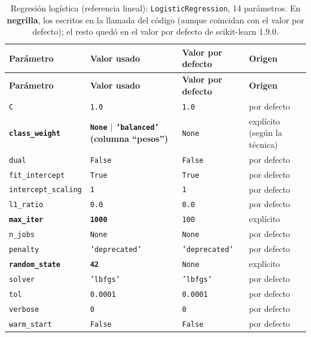\begin{longtable}{L{3.9cm} L{3.7cm} L{3.0cm} L{2.4cm}}
\caption{Regresión logística (referencia lineal): \texttt{LogisticRegression}, 14 parámetros. En \textbf{negrilla}, los escritos en la llamada del código (aunque coincidan con el valor por defecto); el resto quedó en el valor por defecto de scikit-learn 1.9.0.}\label{tab:param-reglog}\\
\toprule
\textbf{Parámetro} & \textbf{Valor usado} & \textbf{Valor por defecto} & \textbf{Origen} \\
\midrule
\endfirsthead
\toprule
\textbf{Parámetro} & \textbf{Valor usado} & \textbf{Valor por defecto} & \textbf{Origen} \\
\midrule
\endhead
\bottomrule
\endfoot
\texttt{C} & \texttt{1.0} & \texttt{1.0} & por defecto \\
\textbf{\texttt{class\_weight}} & \textbf{\texttt{None} $\mid$ \texttt{'balanced'} (columna ``pesos'')} & \texttt{None} & explícito (según la técnica) \\
\texttt{dual} & \texttt{False} & \texttt{False} & por defecto \\
\texttt{fit\_intercept} & \texttt{True} & \texttt{True} & por defecto \\
\texttt{intercept\_scaling} & \texttt{1} & \texttt{1} & por defecto \\
\texttt{l1\_ratio} & \texttt{0.0} & \texttt{0.0} & por defecto \\
\textbf{\texttt{max\_iter}} & \textbf{\texttt{1000}} & \texttt{100} & explícito \\
\texttt{n\_jobs} & \texttt{None} & \texttt{None} & por defecto \\
\texttt{penalty} & \texttt{'deprecated'} & \texttt{'deprecated'} & por defecto \\
\textbf{\texttt{random\_state}} & \textbf{\texttt{42}} & \texttt{None} & explícito \\
\texttt{solver} & \texttt{'lbfgs'} & \texttt{'lbfgs'} & por defecto \\
\texttt{tol} & \texttt{0.0001} & \texttt{0.0001} & por defecto \\
\texttt{verbose} & \texttt{0} & \texttt{0} & por defecto \\
\texttt{warm\_start} & \texttt{False} & \texttt{False} & por defecto \\
\end{longtable}

